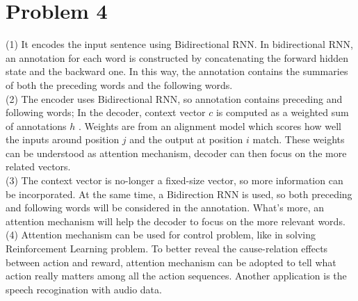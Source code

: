 \documentclass[12pt]{article}
\begin{document}
\section{Problem 4}
(1) It encodes the input sentence using Bidirectional RNN. In bidirectional RNN, an 
annotation for each word is constructed  by concatenating the forward hidden state
and the backward one. In this way, the annotation contains the summaries of both the
preceding words and the following words.\\
(2) The encoder uses Bidirectional RNN, so annotation contains preceding and 
following words;
In the decoder, context vector $c$  is computed as a weighted sum of annotations $h$
. Weights are from an alignment model which scores how well the inputs around 
position $j$ and the output at position $i$ match. These weights can be understood as
attention mechanism, decoder can then focus on the more related vectors.\\
(3) The context vector is no\--longer a fixed\--size vector, so more information can
be incorporated. At the same time, a Bidirection RNN is used, so both preceding and 
following words will be considered in the annotation. What's more, an attention 
mechanism will help the decoder to focus on the more relevant words.\\
(4) Attention mechanism can be used for control problem, like in solving Reinforcement Learning problem. To better reveal the cause\--relation effects between action and reward, attention mechanism can be adopted to tell what action really matters among
all the action sequences. Another application is the speech recogination with audio
data. 
\end{document}
